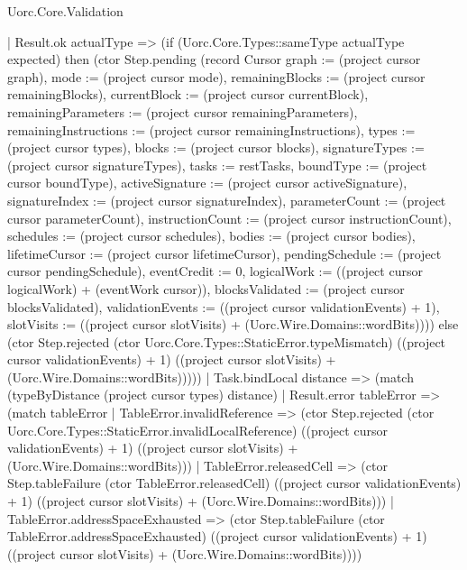 \begin{lexlean}{Uorc.Core.Validation}
\begin{semanticmodule}
{        | Result.ok actualType => (if (Uorc.Core.Types::sameType actualType expected) then (ctor Step.pending (record Cursor {graph := (project cursor graph), mode := (project cursor mode), remainingBlocks := (project cursor remainingBlocks), currentBlock := (project cursor currentBlock), remainingParameters := (project cursor remainingParameters), remainingInstructions := (project cursor remainingInstructions), types := (project cursor types), blocks := (project cursor blocks), signatureTypes := (project cursor signatureTypes), tasks := restTasks, boundType := (project cursor boundType), activeSignature := (project cursor activeSignature), signatureIndex := (project cursor signatureIndex), parameterCount := (project cursor parameterCount), instructionCount := (project cursor instructionCount), schedules := (project cursor schedules), bodies := (project cursor bodies), lifetimeCursor := (project cursor lifetimeCursor), pendingSchedule := (project cursor pendingSchedule), eventCredit := 0, logicalWork := ((project cursor logicalWork) + (eventWork cursor)), blocksValidated := (project cursor blocksValidated), validationEvents := ((project cursor validationEvents) + 1), slotVisits := ((project cursor slotVisits) + (Uorc.Wire.Domains::wordBits))})) else (ctor Step.rejected (ctor Uorc.Core.Types::StaticError.typeMismatch) ((project cursor validationEvents) + 1) ((project cursor slotVisits) + (Uorc.Wire.Domains::wordBits)))))
      | Task.bindLocal distance => (match (typeByDistance (project cursor types) distance)
        | Result.error tableError => (match tableError
          | TableError.invalidReference => (ctor Step.rejected (ctor Uorc.Core.Types::StaticError.invalidLocalReference) ((project cursor validationEvents) + 1) ((project cursor slotVisits) + (Uorc.Wire.Domains::wordBits)))
          | TableError.releasedCell => (ctor Step.tableFailure (ctor TableError.releasedCell) ((project cursor validationEvents) + 1) ((project cursor slotVisits) + (Uorc.Wire.Domains::wordBits)))
          | TableError.addressSpaceExhausted => (ctor Step.tableFailure (ctor TableError.addressSpaceExhausted) ((project cursor validationEvents) + 1) ((project cursor slotVisits) + (Uorc.Wire.Domains::wordBits))))
}
\end{semanticmodule}
\end{lexlean}
